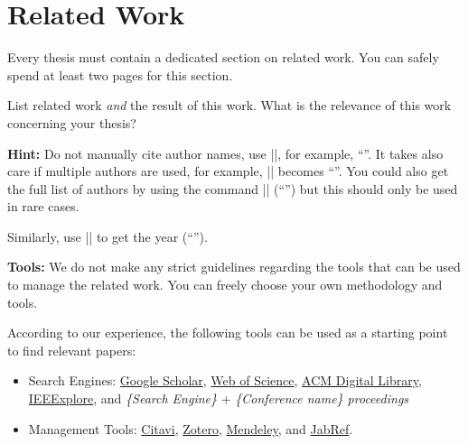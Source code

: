\chapter{Related Work}

Every thesis must contain a dedicated section on related work.
You can safely spend at least two pages for this section.

List related work \emph{and} the result of this work.
What is the relevance of this work concerning your thesis?

\textbf{Hint:} Do not manually cite author names, use \code|\citeauthor{Newsome:05:DTA}|, for example, \enquote{\citeauthor{Newsome:05:DTA}}.
It takes also care if multiple authors are used, for example, \code|\citeauthor{AviramSSHDSVAHD16}| becomes \enquote{\citeauthor{AviramSSHDSVAHD16}}.
You could also get the full list of authors by using the command \code|\citeauthor*{AviramSSHDSVAHD16}| (\enquote{\citeauthor*{AviramSSHDSVAHD16}}) but this should only be used in rare cases.

Similarly, use \code|\citeyear{Newsome:05:DTA}| to get the year (\enquote{\citeyear{Newsome:05:DTA}}).

\textbf{Tools:}
We do not make any strict guidelines regarding the tools that can be used to manage the related work.
You can freely choose your own methodology and tools.

According to our experience, the following tools can be used as a starting point to find relevant papers:
\begin{itemize}
    \item Search Engines: \href{https://scholar.google.com}{Google Scholar}, \href{https://www.webofknowledge.com/}{Web of Science}, \href{https://dl.acm.org/}{ACM Digital Library}, \href{https://ieeexplore.ieee.org/Xplore/home.jsp}{IEEExplore}, and \emph{\{Search Engine\}} + \emph{\{Conference name\} proceedings}
    \item Management Tools: \href{https://www.it-services.ruhr-uni-bochum.de/services/software/citavi.html.de}{Citavi}, \href{https://www.zotero.org/}{Zotero}, \href{https://www.mendeley.com/}{Mendeley}, and \href{https://www.jabref.org/}{JabRef}.
\end{itemize}